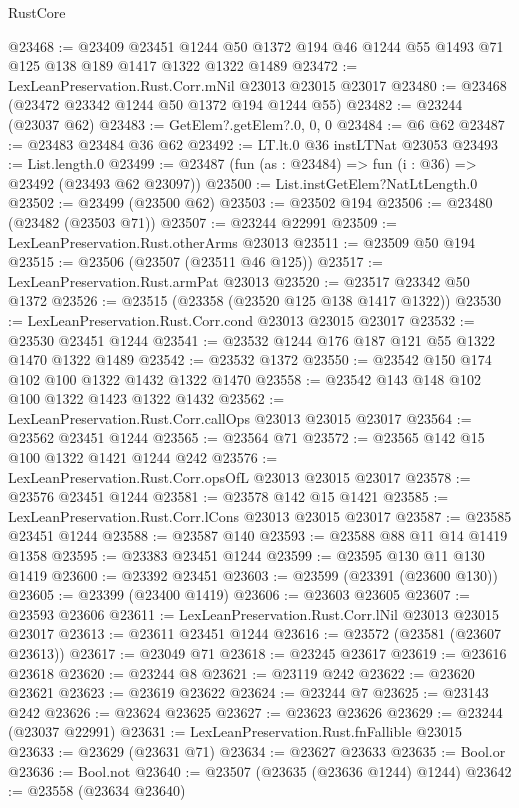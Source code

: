 \begin{lexlean}{RustCore}
\begin{coremodule}
@23468 := @23409
    @23451
    @1244
    @50
    @1372
    @194
    @46
    @1244
    @55
    @1493
    @71
    @125
    @138
    @189
    @1417
    @1322
    @1322
    @1489
@23472 := LexLeanPreservation.Rust.Corr.mNil @23013 @23015 @23017
@23480 := @23468 (@23472 @23342 @1244 @50 @1372 @194 @1244 @55)
@23482 := @23244 (@23037 @62)
@23483 := GetElem?.getElem?.{0, 0, 0}
@23484 := @6 @62
@23487 := @23483 @23484 @36 @62
@23492 := LT.lt.{0} @36 instLTNat @23053
@23493 := List.length.{0}
@23499 := @23487 (fun (as : @23484) => fun (i : @36) => @23492 (@23493 @62 @23097))
@23500 := List.instGetElem?NatLtLength.{0}
@23502 := @23499 (@23500 @62)
@23503 := @23502 @194
@23506 := @23480 (@23482 (@23503 @71))
@23507 := @23244 @22991
@23509 := LexLeanPreservation.Rust.otherArms @23013
@23511 := @23509 @50 @194
@23515 := @23506 (@23507 (@23511 @46 @125))
@23517 := LexLeanPreservation.Rust.armPat @23013
@23520 := @23517 @23342 @50 @1372
@23526 := @23515 (@23358 (@23520 @125 @138 @1417 @1322))
@23530 := LexLeanPreservation.Rust.Corr.cond @23013 @23015 @23017
@23532 := @23530 @23451 @1244
@23541 := @23532 @1244 @176 @187 @121 @55 @1322 @1470 @1322 @1489
@23542 := @23532 @1372
@23550 := @23542 @150 @174 @102 @100 @1322 @1432 @1322 @1470
@23558 := @23542 @143 @148 @102 @100 @1322 @1423 @1322 @1432
@23562 := LexLeanPreservation.Rust.Corr.callOps @23013 @23015 @23017
@23564 := @23562 @23451 @1244
@23565 := @23564 @71
@23572 := @23565 @142 @15 @100 @1322 @1421 @1244 @242
@23576 := LexLeanPreservation.Rust.Corr.opsOfL @23013 @23015 @23017
@23578 := @23576 @23451 @1244
@23581 := @23578 @142 @15 @1421
@23585 := LexLeanPreservation.Rust.Corr.lCons @23013 @23015 @23017
@23587 := @23585 @23451 @1244
@23588 := @23587 @140
@23593 := @23588 @88 @11 @14 @1419 @1358
@23595 := @23383 @23451 @1244
@23599 := @23595 @130 @11 @130 @1419
@23600 := @23392 @23451
@23603 := @23599 (@23391 (@23600 @130))
@23605 := @23399 (@23400 @1419)
@23606 := @23603 @23605
@23607 := @23593 @23606
@23611 := LexLeanPreservation.Rust.Corr.lNil @23013 @23015 @23017
@23613 := @23611 @23451 @1244
@23616 := @23572 (@23581 (@23607 @23613))
@23617 := @23049 @71
@23618 := @23245 @23617
@23619 := @23616 @23618
@23620 := @23244 @8
@23621 := @23119 @242
@23622 := @23620 @23621
@23623 := @23619 @23622
@23624 := @23244 @7
@23625 := @23143 @242
@23626 := @23624 @23625
@23627 := @23623 @23626
@23629 := @23244 (@23037 @22991)
@23631 := LexLeanPreservation.Rust.fnFallible @23015
@23633 := @23629 (@23631 @71)
@23634 := @23627 @23633
@23635 := Bool.or
@23636 := Bool.not
@23640 := @23507 (@23635 (@23636 @1244) @1244)
@23642 := @23558 (@23634 @23640)

\end{coremodule}
\end{lexlean}
